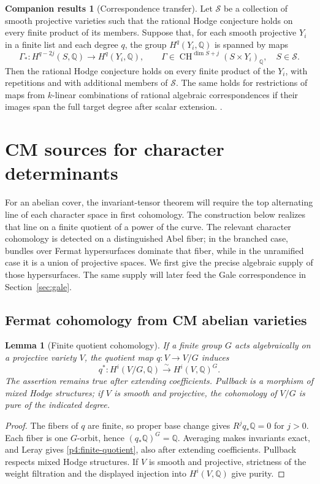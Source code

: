 \documentclass[11pt]{article}
\newcommand{\Q}{\mathbb Q}
\newcommand{\CH}{\operatorname{CH}}
\theoremstyle{plain}
\newtheorem{lemma}[theorem]{Lemma}
\theoremstyle{definition}
\newtheorem{companionresults}[theorem]{Companion results}
\theoremstyle{remark}
\numberwithin{equation}{section}
\begin{document}
\begin{companionresults}[Correspondence transfer]
\label{comp:transfer}
Let \(\mathscr S\) be a
collection of smooth projective varieties such that the rational Hodge
conjecture holds on every finite product of its members.  Suppose that,
for each smooth projective \(Y_i\) in a finite list and each degree
\(q\), the group \(H^q(Y_i,\Q)\) is spanned by maps
\[
 \Gamma_*:H^{q-2j}(S,\Q)\longrightarrow H^q(Y_i,\Q),
 \qquad
 \Gamma\in\CH^{\dim S+j}(S\times Y_i)_\Q,\quad S\in\mathscr S .
\]
Then the rational Hodge conjecture holds on every finite product of
the \(Y_i\), with repetitions and with additional members of
\(\mathscr S\).  The same holds for restrictions of maps from
\(k\)-linear combinations of rational algebraic correspondences if
their images span the full target degree after scalar extension.
\cite[Lemma~2.6]{OpenAIAbelianPowers}.
\end{companionresults}
\section{CM sources for character determinants}
\label{p4:sec:determinants}

For an abelian cover, the invariant-tensor theorem will require the
top alternating line of each character space in first cohomology.
The construction below realizes that line on a finite quotient of a
power of the curve.  The relevant character cohomology is detected
on a distinguished Abel fiber; in the branched case, bundles over
Fermat hypersurfaces dominate that fiber, while in the unramified case
it is a union of projective spaces.  We first give the precise
algebraic supply of those hypersurfaces.  The same supply will
later feed the Gale correspondence in Section~\ref{sec:gale}.

\subsection{Fermat cohomology from CM abelian varieties}

\begin{lemma}[Finite quotient cohomology]\label{lem:quotient}
If a finite group \(G\) acts algebraically on a projective variety
\(V\), the quotient map \(q:V\to V/G\) induces
\begin{equation}
 \label{p4:finite-quotient}
 q^*:H^i(V/G,\Q)\xrightarrow{\;\sim\;}H^i(V,\Q)^G.
\end{equation}
The assertion remains true after extending coefficients.  Pullback is
a morphism of mixed Hodge structures; if \(V\) is smooth and projective,
the cohomology of \(V/G\) is pure of the indicated degree.
\end{lemma}
\begin{proof}
The fibers of \(q\) are finite, so proper base change gives
\(R^j q_*\Q=0\) for \(j>0\).  Each fiber is one \(G\)-orbit, hence
\((q_*\Q)^G=\Q\).  Averaging makes invariants exact, and Leray gives
\eqref{p4:finite-quotient}, also after extending coefficients.
Pullback respects mixed Hodge structures.  If \(V\) is smooth and
projective, strictness of the weight filtration and the displayed
injection into \(H^i(V,\Q)\) give purity.
\end{proof}
\end{document}
